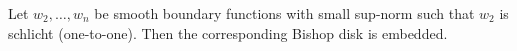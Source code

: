 
Let $w_2, \ldots, w_n$ be smooth boundary functions with small sup-norm such that $w_2$ is schlicht (one-to-one). Then the corresponding Bishop disk is embedded.
